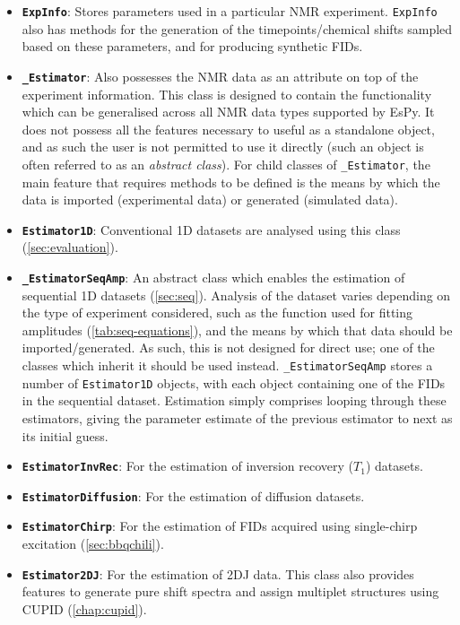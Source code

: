 \begin{itemize}
    \item \textbf{\textbf{\texttt{ExpInfo}}}: Stores parameters used in a particular \ac{NMR}
        experiment. \texttt{ExpInfo} also has methods for the generation of the
        timepoints/chemical shifts sampled based on these parameters, and for
        producing synthetic \acp{FID}.
    \item \textbf{\texttt{\_Estimator}}: Also possesses the \ac{NMR} data as an
        attribute on top of the experiment information. This class is
        designed to contain the functionality which can be generalised across
        all \ac{NMR} data types supported by \ac{EsPy}. It does not
        possess all the features necessary to useful as a standalone object,
        and as such the user is not permitted to use it directly (such an
        object is often referred to as an \emph{abstract class}). For child
        classes of \texttt{\_Estimator}, the main feature that requires methods
        to be defined is the means by which the data is imported (experimental
        data) or generated (simulated data).
    \item \textbf{\texttt{Estimator1D}}: Conventional \ac{1D} datasets are
        analysed using this class (\cref{sec:evaluation}).
    \item \textbf{\texttt{\_EstimatorSeqAmp}}: An abstract class
        which enables the estimation of sequential \ac{1D} datasets
        (\cref{sec:seq}). Analysis of the dataset varies depending on
        the type of experiment considered, such as the function used for
        fitting amplitudes (\cref{tab:seq-equations}), and the means by
        which that data should be imported/generated. As such, this is not
        designed for direct use; one of the classes which inherit it should be
        used instead. \texttt{\_EstimatorSeqAmp} stores a number of
        \texttt{Estimator1D} objects, with each object containing one of the
        \acp{FID} in the sequential dataset. Estimation simply comprises
        looping through these estimators, giving the parameter estimate of the
        previous estimator to next as its initial guess.
    \item \textbf{\texttt{EstimatorInvRec}}: For the estimation of inversion
        recovery ($T_1$) datasets.
    \item \textbf{\texttt{EstimatorDiffusion}}: For the estimation of
        diffusion datasets.
    \item \textbf{\texttt{EstimatorChirp}}: For the estimation of \acp{FID}
        acquired using single-chirp excitation (\cref{sec:bbqchili}).
    \item \textbf{\texttt{Estimator2DJ}}: For the estimation of \ac{2DJ} data.
        This class also provides features to generate pure shift spectra and
        assign multiplet structures using \ac{CUPID} (\cref{chap:cupid}).
\end{itemize}

